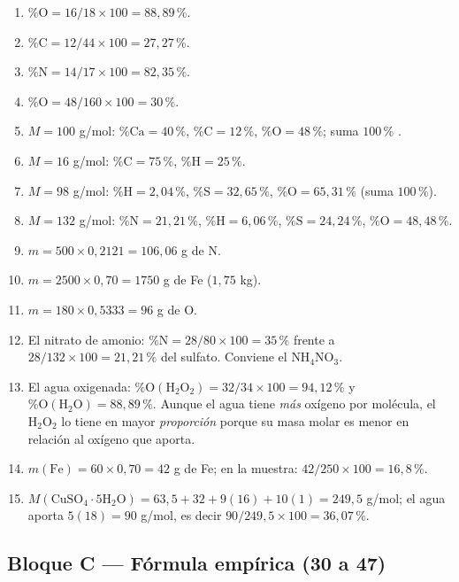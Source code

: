 \documentclass[12pt, letterpaper]{article}
\newcommand{\pc}{\text{\%}}
\begin{document}
  \begin{enumerate}[leftmargin=*, label=\textbf{\arabic*.}, start=15]
    \item $\pc\text{O} = 16/18\times100 = 88{,}89\,\pc$.
    \item $\pc\text{C} = 12/44\times100 = 27{,}27\,\pc$.
    \item $\pc\text{N} = 14/17\times100 = 82{,}35\,\pc$.
    \item $\pc\text{O} = 48/160\times100 = 30\,\pc$.
    \item $M = 100$ g/mol: $\pc\text{Ca} = 40\,\pc$, $\pc\text{C} = 12\,\pc$, $\pc\text{O} = 48\,\pc$; suma $100\,\pc$ \checkmark.
    \item $M = 16$ g/mol: $\pc\text{C} = 75\,\pc$, $\pc\text{H} = 25\,\pc$.
    \item $M = 98$ g/mol: $\pc\text{H} = 2{,}04\,\pc$, $\pc\text{S} = 32{,}65\,\pc$, $\pc\text{O} = 65{,}31\,\pc$ (suma $100\,\pc$).
    \item $M = 132$ g/mol: $\pc\text{N} = 21{,}21\,\pc$, $\pc\text{H} = 6{,}06\,\pc$, $\pc\text{S} = 24{,}24\,\pc$, $\pc\text{O} = 48{,}48\,\pc$.
    \item $m = 500 \times 0{,}2121 = 106{,}06$ g de N.
    \item $m = 2500 \times 0{,}70 = 1750$ g de Fe ($1{,}75$ kg).
    \item $m = 180 \times 0{,}5333 = 96$ g de O.
    \item El nitrato de amonio: $\pc\text{N} = 28/80\times100 = 35\,\pc$ frente a $28/132\times100 = 21{,}21\,\pc$ del sulfato. Conviene el $\text{NH}_4\text{NO}_3$.
    \item El agua oxigenada: $\pc\text{O}(\text{H}_2\text{O}_2) = 32/34\times100 = 94{,}12\,\pc$ y $\pc\text{O}(\text{H}_2\text{O}) = 88{,}89\,\pc$. Aunque el agua tiene \emph{más} oxígeno por molécula, el $\text{H}_2\text{O}_2$ lo tiene en mayor \emph{proporción} porque su masa molar es menor en relación al oxígeno que aporta.
    \item $m(\text{Fe}) = 60 \times 0{,}70 = 42$ g de Fe; en la muestra: $42/250\times100 = 16{,}8\,\pc$.
    \item $M(\text{CuSO}_4\cdot5\text{H}_2\text{O}) = 63{,}5 + 32 + 9(16) + 10(1) = 249{,}5$ g/mol; el agua aporta $5(18) = 90$ g/mol, es decir $90/249{,}5\times100 = 36{,}07\,\pc$.
  \end{enumerate}

  \subsection*{Bloque C — Fórmula empírica (30 a 47)}
\end{document}
